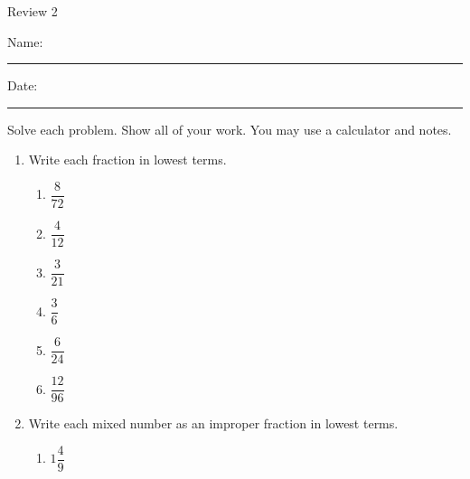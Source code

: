 \documentclass[12pt]{article}
\begin{document}
\pagestyle{empty} %
\begin{center}
          Review 2 \\[0.5in]
\end{center}
Name: \rule{4in}{0.005in} Date: \rule{1.5in}{0.005in} 
  \vspace{0.25in}
Solve each problem. Show all of your work. You may use a calculator and notes. 

\begin{enumerate}
	\item Write each fraction in lowest terms. 
\begin{multicols}{2}
\begin{enumerate}

    \item \hspace{0.50in} $\dfrac{8}{72}$
  \vspace{0.25in}

    \item \hspace{0.50in} $\dfrac{4}{12}$
  \vspace{0.25in}

    \item \hspace{0.50in} $\dfrac{3}{21}$
  \vspace{0.25in}

    \item \hspace{0.50in} $\dfrac{3}{6}$
  \vspace{0.25in}

    \item \hspace{0.50in} $\dfrac{6}{24}$
  \vspace{0.25in}

    \item \hspace{0.50in} $\dfrac{12}{96}$
  \vspace{0.25in}

\end{enumerate}
\end{multicols}
  \vspace{0.25in}

\item Write each mixed number as an improper fraction in lowest terms.
\begin{multicols}{2}
\begin{enumerate}

    \item \hspace{0.50in} $1\dfrac{4}{9}$
  \vspace{0.25in}


\end{enumerate}
\end{multicols}
\end{enumerate}
\end{document}
